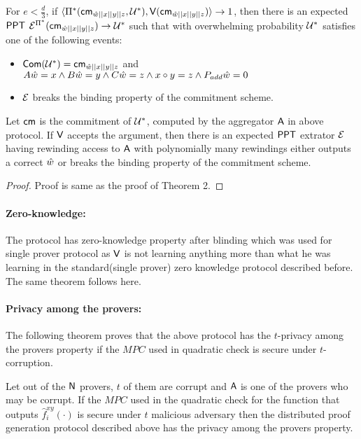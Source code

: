 \begin{theorem}
		For $e < \frac{d}{3}$, if $\langle \Pi^*(\mathsf{cm}_{\hat{w}||x||y||z}, \mathcal{U}^*),\mathsf{V}(\mathsf{cm}_{\hat{w}||x||y||z})\rangle \rightarrow 1$, then there is an expected $\mathsf{PPT}$ $\mathcal{E}^{\Pi^*}(\mathsf{cm}_{\hat{w}||x||y||z}) \rightarrow \mathcal{U}^*$ such that with overwhelming probability $\mathcal{U}^*$ satisfies one of the following events:
	\begin{itemize}
		\item $\mathsf{Com}(\mathcal{U}^*)=\mathsf{cm}_{\hat{w}||x||y||z}$ and $A\hat{w} = x \wedge B \hat{w} = y \wedge C \hat{w} = z \wedge x\circ y =z \wedge P_{add} \hat{w} = 0$
		\item $\mathcal{E}$ breaks the binding property of the commitment scheme.
		
	\end{itemize}
	Let $\mathsf{cm}$ is the commitment of $\mathcal{U}^*$, computed by the aggregator $\mathsf{A}$ in above protocol. If $\mathsf{V}$ accepts the argument, then there is an expected $\mathsf{PPT}$ extrator $\mathcal{E}$ having rewinding access to $\mathsf{A}$ with polynomially many rewindings either outputs a correct $\hat{w}$ or breaks the binding property of the commitment scheme.
\end{theorem}
 
\begin{proof}
	Proof is same as the proof of Theorem 2.
\end{proof}

\paragraph{Zero-knowledge: } The protocol has zero-knowledge property after blinding which was used for single prover protocol as $\mathsf{V}$ is not learning anything more than what he was learning in the standard(single prover) zero knowledge protocol described before. The same theorem follows here.

\paragraph{Privacy among the provers: } The following theorem proves that the above protocol has the $t$-privacy among the provers property if the $MPC$ used in quadratic check is secure under $t$-corruption.

\begin{theorem}
	Let out of the $\mathsf{N}$ provers, $t$ of them are corrupt and $\mathsf{A}$ is one of the provers who may be corrupt. If the $MPC$ used in the quadratic check for the function that outputs $\hat{f}^{xy}_i(\cdot)$ is secure under $t$ malicious adversary then the distributed proof generation protocol described above has the privacy among the provers property. 
\end{theorem} 

